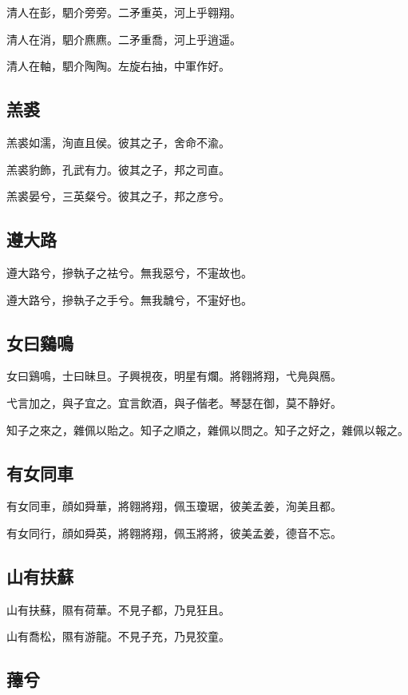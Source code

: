 清人在彭，駟介旁旁。二矛重英，河上乎翱翔。

清人在消，駟介麃麃。二矛重喬，河上乎逍遥。

清人在軸，駟介陶陶。左旋右抽，中軍作好。

\subsection[羔裘]{羔裘}

羔裘如濡，洵直且侯。彼其之子，舍命不渝。

羔裘豹飾，孔武有力。彼其之子，邦之司直。

羔裘晏兮，三英粲兮。彼其之子，邦之彦兮。

\subsection[遵大路]{遵大路}

遵大路兮，摻執子之袪兮。無我惡兮，不寁故也。

遵大路兮，摻執子之手兮。無我魗兮，不寁好也。

\subsection[女曰鷄鳴]{女曰鷄鳴}

女曰鷄鳴，士曰昧旦。子興視夜，明星有爛。將翱將翔，弋鳧與鴈。

弋言加之，與子宜之。宜言飲酒，與子偕老。琴瑟在御，莫不静好。

知子之來之，雜佩以貽之。知子之順之，雜佩以問之。知子之好之，雜佩以報之。

\subsection[有女同車]{有女同車}

有女同車，顔如舜華，將翱將翔，佩玉瓊琚，彼美孟姜，洵美且都。

有女同行，顔如舜英，將翱將翔，佩玉將將，彼美孟姜，德音不忘。

\subsection[山有扶蘇]{山有扶蘇}

山有扶蘇，隰有荷華。不見子都，乃見狂且。

山有喬松，隰有游龍。不見子充，乃見狡童。

\subsection[蘀兮]{蘀兮}

